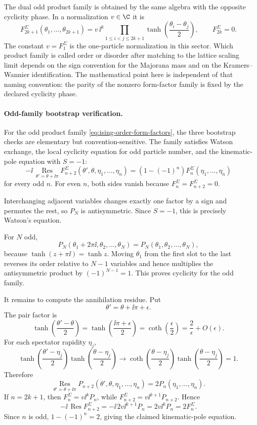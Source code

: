 The dual odd product family is obtained by the same algebra with the opposite
cyclicity phase.  In a normalization \(v\in\C\) it is
\begin{equation}
  F_{2k+1}^{\Sigma}(\theta_1,\ldots,\theta_{2k+1})
  =
  v\,\ii^k
  \prod_{1\le i<j\le 2k+1}
  \tanh\!\left(\frac{\theta_i-\theta_j}{2}\right),
  \qquad
  F_{2k}^{\Sigma}=0 .
  \label{eq:ising-order-form-factors}
\end{equation}
The constant \(v=F_1^\Sigma\) is the one-particle normalization in this
sector.  Which product family is called order or disorder after matching to
the lattice scaling limit depends on the sign convention for the Majorana
mass and on the Kramers--Wannier identification.  The mathematical point here
is independent of that naming convention: the parity of the nonzero
form-factor family is fixed by the declared cyclicity phase.

\paragraph{Odd-family bootstrap verification.}
For the odd product family \eqref{eq:ising-order-form-factors}, the three
bootstrap checks are elementary but convention-sensitive.  The family satisfies
Watson exchange, the local cyclicity equation for odd particle number, and the
kinematic-pole equation with \(S=-1\):
\[
  -\ii\,\operatorname*{Res}_{\theta'=\theta+\ii\pi}
  F_{n+2}^{\Sigma}(\theta',\theta,\eta_1,\ldots,\eta_n)
  =
  \left(1-(-1)^n\right)F_n^\Sigma(\eta_1,\ldots,\eta_n)
\]
for every odd \(n\).  For even \(n\), both sides vanish because
\(F_n^\Sigma=F_{n+2}^\Sigma=0\).

Interchanging adjacent variables changes exactly one factor by a sign and
permutes the rest, so \(P_N\) is antisymmetric.  Since \(S=-1\), this is
precisely Watson's equation.

For \(N\) odd,
\[
  P_N(\theta_1+2\pi\ii,\theta_2,\ldots,\theta_N)
  =
  P_N(\theta_1,\theta_2,\ldots,\theta_N),
\]
because \(\tanh(z+\pi\ii)=\tanh z\).  Moving \(\theta_1\) from the first
slot to the last reverses its order relative to \(N-1\) variables and hence
multiplies the antisymmetric product by \((-1)^{N-1}=1\).  This proves
cyclicity for the odd family.

It remains to compute the annihilation residue.  Put
\[
  \theta'=\theta+\ii\pi+\epsilon .
\]
The pair factor is
\[
  \tanh\!\left(\frac{\theta'-\theta}{2}\right)
  =
  \tanh\!\left(\frac{\ii\pi+\epsilon}{2}\right)
  =
  \coth\!\left(\frac{\epsilon}{2}\right)
  =
  \frac{2}{\epsilon}+O(\epsilon).
\]
For each spectator rapidity \(\eta_j\),
\[
  \tanh\!\left(\frac{\theta'-\eta_j}{2}\right)
  \tanh\!\left(\frac{\theta-\eta_j}{2}\right)
  \longrightarrow
  \coth\!\left(\frac{\theta-\eta_j}{2}\right)
  \tanh\!\left(\frac{\theta-\eta_j}{2}\right)
  =
  1 .
\]
Therefore
\[
  \operatorname*{Res}_{\theta'=\theta+\ii\pi}
  P_{n+2}(\theta',\theta,\eta_1,\ldots,\eta_n)
  =
  2P_n(\eta_1,\ldots,\eta_n).
\]
If \(n=2k+1\), then \(F_n^\Sigma=v\ii^kP_n\), while
\(F_{n+2}^\Sigma=v\ii^{k+1}P_{n+2}\).  Hence
\[
  -\ii\,\operatorname*{Res} F_{n+2}^\Sigma
  =
  -\ii\,2v\ii^{k+1}P_n
  =
  2v\ii^kP_n
  =
  2F_n^\Sigma .
\]
Since \(n\) is odd, \(1-(-1)^n=2\), giving the claimed kinematic-pole
equation.

